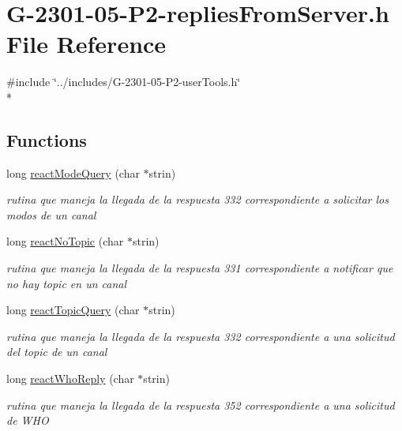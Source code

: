 \hypertarget{_g-2301-05-_p2-replies_from_server_8h}{\section{G-\/2301-\/05-\/\-P2-\/replies\-From\-Server.h File Reference}
\label{_g-2301-05-_p2-replies_from_server_8h}
}
{\ttfamily \#include \char`\"{}../includes/\-G-\/2301-\/05-\/\-P2-\/user\-Tools.\-h\char`\"{}}\\*
\subsection*{Functions}
\begin{DoxyCompactItemize}
\item 
long \hyperlink{_g-2301-05-_p2-replies_from_server_8h_a2ecfb7128199b664a1232e6adaa13b1d}{react\-Mode\-Query} (char $\ast$strin)
\begin{DoxyCompactList}\small\item\em rutina que maneja la llegada de la respuesta 332 correspondiente a solicitar los modos de un canal \end{DoxyCompactList}\item 
long \hyperlink{_g-2301-05-_p2-replies_from_server_8h_a0fab1e2795c83c39f5e728b150a73195}{react\-No\-Topic} (char $\ast$strin)
\begin{DoxyCompactList}\small\item\em rutina que maneja la llegada de la respuesta 331 correspondiente a notificar que no hay topic en un canal \end{DoxyCompactList}\item 
long \hyperlink{_g-2301-05-_p2-replies_from_server_8h_a46cb9b388176d279b37de41cef5a0d40}{react\-Topic\-Query} (char $\ast$strin)
\begin{DoxyCompactList}\small\item\em rutina que maneja la llegada de la respuesta 332 correspondiente a una solicitud del topic de un canal \end{DoxyCompactList}\item 
long \hyperlink{_g-2301-05-_p2-replies_from_server_8h_a76b90dab2968c81d3006f5c05978fb39}{react\-Who\-Reply} (char $\ast$strin)
\begin{DoxyCompactList}\small\item\em rutina que maneja la llegada de la respuesta 352 correspondiente a una solicitud de W\-H\-O \end{DoxyCompactList}\end{DoxyCompactItemize}


